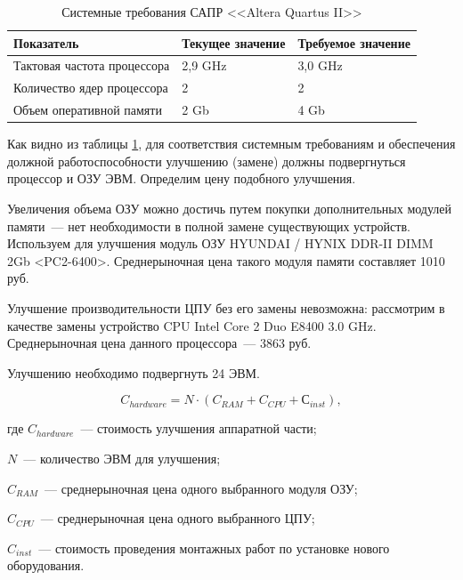 \begin{table}[H]
  \caption{Системные требования САПР <<Altera Quartus II>>}\label{table:compare-req}
  \begin{tabular}{|p{}|l|l|}
  \hline
    \textbf{Показатель}             & \textbf{Текущее значение} & \textbf{Требуемое значение}
  \\ \hline
    Тактовая частота процессора     & 2,9 GHz                   & 3,0 GHz
  \\ \hline
    Количество ядер процессора      & 2                         & 2
  \\ \hline
    Объем оперативной памяти        & 2 Gb                      & 4 Gb
  \\ \hline
  \end{tabular}
\end{table}

Как видно из таблицы \ref{table:compare-req}, для соответствия системным требованиям и обеспечения должной работоспособности улучшению (замене) должны подвергнуться процессор и ОЗУ ЭВМ.
Определим цену подобного улучшения.

Увеличения объема ОЗУ можно достичь путем покупки дополнительных модулей памяти~--- нет необходимости в полной замене существующих устройств.
Используем для улучшения модуль ОЗУ HYUNDAI / HYNIX DDR-II DIMM 2Gb <PC2-6400>.
Среднерыночная цена такого модуля памяти составляет 1010 руб.

Улучшение производительности ЦПУ без его замены невозможна: рассмотрим в качестве замены устройство CPU Intel Core 2 Duo E8400 3.0 GHz.
Среднерыночная цена данного процессора~--- 3863 руб.

Улучшению необходимо подвергнуть 24 ЭВМ.

\begin{equation}
  C_{hardware} = N \cdot (C_{RAM} + C_{CPU} + С_{inst}),
\end{equation}
\begin{ESKDexplanation}
  \item[где ] $C_{hardware}$~--- стоимость улучшения аппаратной части;
  \item $N$~--- количество ЭВМ для улучшения;
  \item $C_{RAM}$~--- среднерыночная цена одного выбранного модуля ОЗУ;
  \item $C_{CPU}$~--- среднерыночная цена одного выбранного ЦПУ;
  \item $C_{inst}$~--- стоимость проведения монтажных работ по установке нового оборудования.
\end{ESKDexplanation}

